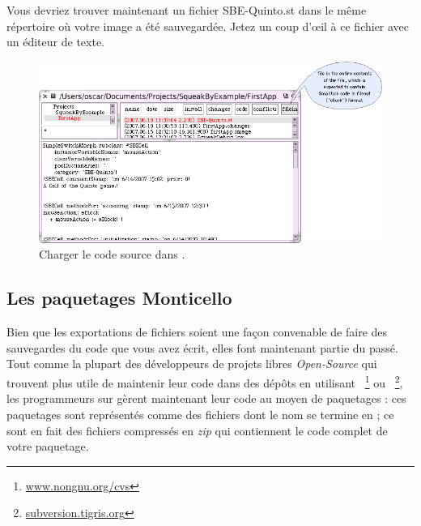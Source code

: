 \documentclass[a4paper,10pt,twoside]{book}
\begin{document}
Vous devriez trouver maintenant un fichier SBE-Quinto.st dans le même
répertoire où votre image a été sauvegardée.
Jetez un coup d'\oe il à ce fichier avec un éditeur de texte.


\begin{figure}[ht]
\centerline {\includegraphics[width=\textwidth]{FileIn}}
\caption{Charger le code source dans \sq.
\label{fig:filein}}
\end{figure}

\subsection{Les paquetages Monticello}
Bien que les exportations de fichiers soient une façon convenable de
faire des sauvegardes du code que vous avez écrit, elles font
maintenant partie du passé.
Tout comme la plupart des d\'eveloppeurs de projets libres
\emph{Open-Source} qui trouvent plus utile de maintenir leur code dans
des dépôts en utilisant ~\footnote{\url{www.nongnu.org/cvs}}
ou ~\footnote{\url{subversion.tigris.org}}, les
programmeurs sur \sq gèrent maintenant leur code au moyen de
paquetages : 
ces paquetages sont représentés comme des fichiers dont le nom se
termine en ; ce sont en fait des fichiers compressés en
\emph{zip} qui contiennent le code complet de votre paquetage.
\end{document}
